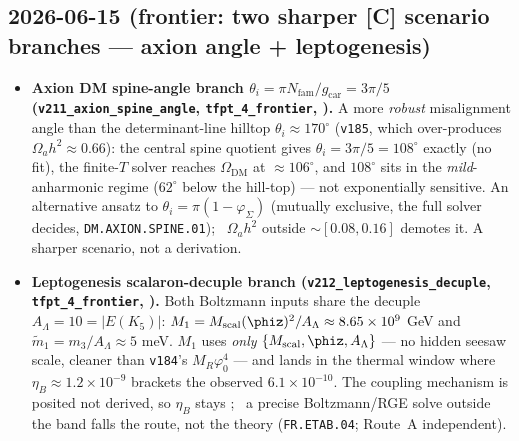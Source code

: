 \documentclass[11pt]{article}
\providecommand{\gcar}{g_{\mathrm{car}}}\providecommand{\Nfam}{N_{\mathrm{fam}}}
\begin{document}
\subsection*{2026-06-15 (frontier: two sharper [C] scenario branches --- axion angle + leptogenesis)}
\begin{itemize}
\item \textbf{Axion DM spine-angle branch $\theta_i=\pi\Nfam/\gcar=3\pi/5$ (\texttt{v211\_axion\_spine\_angle},
  \texttt{tfpt\_4\_frontier}, \mC).} A more \emph{robust} misalignment angle than the determinant-line hilltop
  $\theta_i\approx170^\circ$ (\texttt{v185}, which over-produces $\Omega_a h^2\approx0.66$): the central spine
  quotient gives $\theta_i=3\pi/5=108^\circ$ exactly (no fit), the finite-$T$ solver reaches
  $\Omega_{\mathrm{DM}}$ at ${\approx}106^\circ$, and $108^\circ$ sits in the \emph{mild}-anharmonic regime
  ($62^\circ$ below the hill-top) --- not exponentially sensitive. An alternative ansatz to
  $\theta_i=\pi(1-\varphi_\Sigma)$ (mutually exclusive, the full solver decides, \texttt{DM.AXION.SPINE.01});
  \mX\ $\Omega_a h^2$ outside ${\sim}[0.08,0.16]$ demotes it. A sharper scenario, not a derivation.
\item \textbf{Leptogenesis scalaron-decuple branch (\texttt{v212\_leptogenesis\_decuple},
  \texttt{tfpt\_4\_frontier}, \mC).} Both Boltzmann inputs share the decuple $A_\Lambda=10=|E(K_5)|$:
  $M_1=M_{\mathrm{scal}}(\phiz)^2/A_\Lambda\approx8.65\times10^9$ GeV and $\tilde m_1=m_3/A_\Lambda\approx5$ meV.
  $M_1$ uses \emph{only} $\{M_{\mathrm{scal}},\phiz,A_\Lambda\}$ --- no hidden seesaw scale, cleaner than
  \texttt{v184}'s $M_R\varphi_0^4$ --- and lands in the thermal window where $\eta_B\approx1.2\times10^{-9}$
  brackets the observed $6.1\times10^{-10}$. The coupling mechanism is posited not derived, so $\eta_B$ stays
  \mC; \mX\ a precise Boltzmann/RGE solve outside the band falls the route, not the theory
  (\texttt{FR.ETAB.04}; Route~A independent).
\end{itemize}
\end{document}
